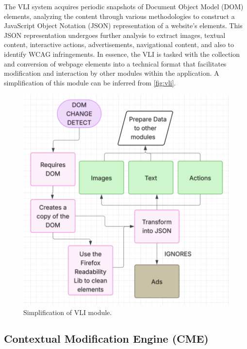 \documentclass[conference]{IEEEtran}
\begin{document}
The VLI system acquires periodic snapshots of Document Object Model (DOM) elements, analyzing the content through various methodologies to construct a JavaScript Object Notation (JSON) representation of a website's elements. This JSON representation undergoes further analysis to extract images, textual content, interactive actions, advertisements, navigational content, and also to identify WCAG infringements. In essence, the VLI is tasked with the collection and conversion of webpage elements into a technical format that facilitates modification and interaction by other modules within the application. A simplification of this module can be inferred from \autoref{fig:vli}.

\begin{figure}[h]
\centering
\includegraphics[width=\columnwidth]{images/VLI.png}
\caption{Simplification of VLI module.}
\label{fig:vli}
\end{figure}


\subsection{Contextual Modification Engine (CME)}
\end{document}
